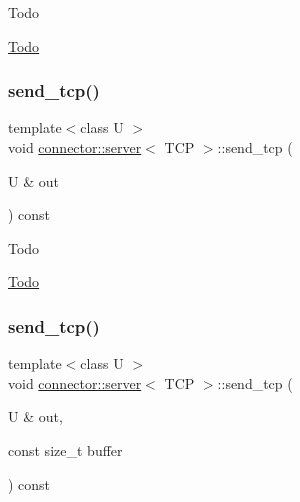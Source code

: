 \begin{DoxyRefDesc}{Todo}
\item[\hyperlink{todo__todo000010}{Todo}]\end{DoxyRefDesc}
\mbox{\label{classconnector_1_1server_3_01TCP_01_4_aacfd27c6a4e59793c4440b8f3030e811}} 
\subsubsection{\texorpdfstring{send\+\_\+tcp()}{send\_tcp()}\hspace{0.1cm}{\footnotesize\ttfamily [1/2]}}
{\footnotesize\ttfamily template$<$class U $>$ \\
void \hyperlink{classconnector_1_1server}{connector\+::server}$<$ T\+CP $>$\+::send\+\_\+tcp (\begin{DoxyParamCaption}\item[{U \&}]{out }\end{DoxyParamCaption}) const\hspace{0.3cm}{\ttfamily [inline]}}

\begin{DoxyRefDesc}{Todo}
\item[\hyperlink{todo__todo000011}{Todo}]\end{DoxyRefDesc}
\mbox{\label{classconnector_1_1server_3_01TCP_01_4_a89afed1ab41b02c9eb39bd617787a1f3}} 
\subsubsection{\texorpdfstring{send\+\_\+tcp()}{send\_tcp()}\hspace{0.1cm}{\footnotesize\ttfamily [2/2]}}
{\footnotesize\ttfamily template$<$class U $>$ \\
void \hyperlink{classconnector_1_1server}{connector\+::server}$<$ T\+CP $>$\+::send\+\_\+tcp (\begin{DoxyParamCaption}\item[{U \&}]{out,  }\item[{const size\+\_\+t}]{buffer }\end{DoxyParamCaption}) const\hspace{0.3cm}{\ttfamily [inline]}}

